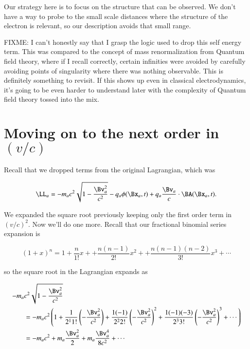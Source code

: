 Our strategy here is to focus on the structure that can be observed.  We don't have a way to probe to the small scale distances where the structure of the electron is relevant, so our description avoids that small range.

FIXME: I can't honestly say that I grasp the logic used to drop this self energy term.  This was compared to the concept of mass renormalization from Quantum field theory, where if I recall correctly, certain infinities were avoided by carefully avoiding points of singularity where there was nothing observable.  This is definitely something to revisit.  If this shows up even in classical electrodynamics, it's going to be even harder to understand later with the complexity of Quantum field theory tossed into the mix.

\section{Moving on to the next order in $(v/c)$}

Recall that we dropped terms from the original Lagrangian, which was

\begin{equation}\label{eqn:relativisticElectrodynamicsL25:90}
\LL_a = - m_a c^2 \sqrt{ 1 - \frac{\Bv_a^2}{c^2}} - q_a \phi(\Bx_a, t) + q_a \frac{\Bv_a}{c} \cdot \BA(\Bx_a, t).
\end{equation}

We expanded the square root previously keeping only the first order term in $(v/c)^2$.  Now we'll do one more.  Recall that our fractional binomial series expansion is

\begin{equation}\label{eqn:relativisticElectrodynamicsL25:91}
(1 + x)^n = 1 
+ \frac{n}{1!} x + 
+ \frac{n(n-1)}{2!} x^2 + 
+ \frac{n(n-1)(n-2)}{3!} x^3 + \cdots
\end{equation}

so the square root in the Lagrangian expands as

\begin{align*}
- m_a &c^2 \sqrt{ 1 - \frac{\Bv_a^2}{c^2}} \\
&=
- m_a c^2 \left(1
+ \frac{1}{2^1 1!} 
\left(- \frac{\Bv_a^2}{c^2}  \right)
+ \frac{1(-1)}{2^2 2!} 
\left(- \frac{\Bv_a^2}{c^2}  \right)^2
+ \frac{1(-1)(-3)}{2^3 3!} 
\left(- \frac{\Bv_a^2}{c^2}  \right)^3 + \cdots
\right) \\
&=
- m_a c^2 + m_a \frac{\Bv_a^2}{2} + m_a \frac{\Bv_a^4}{8 c^2} + \cdots
\end{align*}

